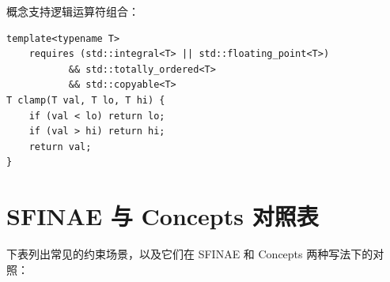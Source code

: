 \documentclass[12pt,a4paper,fontset=fandol]{ctexbook}
\begin{document}
概念支持逻辑运算符组合：

\begin{lstlisting}
template<typename T>
    requires (std::integral<T> || std::floating_point<T>)
           && std::totally_ordered<T>
           && std::copyable<T>
T clamp(T val, T lo, T hi) {
    if (val < lo) return lo;
    if (val > hi) return hi;
    return val;
}
\end{lstlisting}

\section{SFINAE 与 Concepts 对照表}

下表列出常见的约束场景，以及它们在 SFINAE 和 Concepts 两种写法下的对照：
\end{document}
